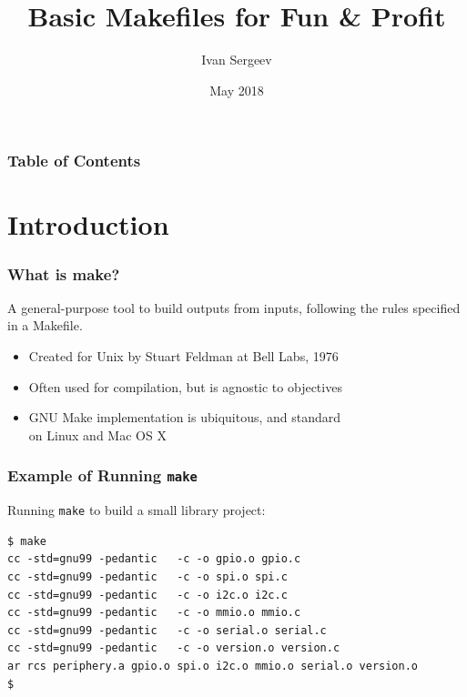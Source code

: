 \documentclass[xcolor=dvipsnames,t,compress]{beamer}
\title{Basic Makefiles for Fun \& Profit}
\author{Ivan Sergeev}
\institute{\normalsize\texttt{git clone https://github.com/vsergeev/linux-talks.git}}
\date{May 2018}
\begin{document}
\frame{\titlepage}

\begin{frame}
\frametitle{Table of Contents}
\tableofcontents
\end{frame}


\section{Introduction}

\begin{frame}
\frametitle{What is make?}
A general-purpose tool to build outputs from inputs, following the rules specified in a Makefile.

\begin{itemize}[<+->]
\item Created for Unix by Stuart Feldman at Bell Labs, 1976
\item Often used for compilation, but is agnostic to objectives
\item GNU Make implementation is ubiquitous, and standard \\ on Linux and Mac OS X
\end{itemize}
\end{frame}

\begin{frame}[fragile]
\frametitle{Example of Running \texttt{make}}
Running \texttt{make} to build a small library project:
\\
\begin{verbatim}
$ make
cc -std=gnu99 -pedantic   -c -o gpio.o gpio.c
cc -std=gnu99 -pedantic   -c -o spi.o spi.c
cc -std=gnu99 -pedantic   -c -o i2c.o i2c.c
cc -std=gnu99 -pedantic   -c -o mmio.o mmio.c
cc -std=gnu99 -pedantic   -c -o serial.o serial.c
cc -std=gnu99 -pedantic   -c -o version.o version.c
ar rcs periphery.a gpio.o spi.o i2c.o mmio.o serial.o version.o
$ 
\end{verbatim}
\end{frame}
\end{document}
